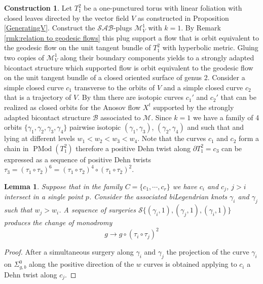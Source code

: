 \documentclass{amsart}
\newtheorem{lemma}[theorem]{Lemma}
\theoremstyle{definition}
\newtheorem{construction}[theorem]{Construction}
\theoremstyle{remark}
\DeclareMathOperator{\PMod}{PMod}
\begin{document}
\begin{construction}
\label{con}
Let $T_1^2$ be a one-punctured torus with linear foliation with closed leaves directed by the vector field $V$ as constructed in Proposition \ref{GeneratingV}. Construct the $\mathcal{SAB}$-plugs $\mathcal{M}_V^1$ with $k=1$. By Remark \ref{rmk:relation to geodesic flows} this plug support a flow that is orbit equivalent to the geodesic flow on the unit tangent bundle of $T_1^2$ with hyperbolic metric. Gluing two copies of $\mathcal{M}_V^1$ along their boundary components yields to a strongly adapted bicontact structure which supported flow is orbit equivalent to the geodesic flow on the unit tangent bundle of a closed oriented surface of genus 2. Consider a simple closed curve $c_1$ transverse to the orbits of $V$ and a simple closed curve $c_2$ that is a trajectory of $V$. By thm there are isotopic curves $c_1'$ and $c_2'$ that can be realized as closed orbits for the Anosov flow $X^t$ supported by the strongly adapted bicontact structure $\mathcal{B}$ associated to $\mathcal{M}$. Since $k=1$ we have a family of 4 orbits $\{\gamma_1,\gamma_2,\gamma_3,\gamma_4\}$ pairwise isotopic $(\gamma_1,\gamma_3)$, $(\gamma_2,\gamma_4)$ and such that  and lying at different levels $w_1<w_2<w_3<w_4$. Note that the curves $c_1$ and $c_2$ form a chain in $\PMod(T_1^2)$ therefore a positive Dehn twist along $\partial T_1^2=c_3$ can be expressed as a sequence of positive Dehn twists  
$\tau_3=(\tau_1\circ \tau_2)^6=(\tau_1\circ \tau_2)^4\circ (\tau_1\circ \tau_2)^2 $.

\begin{lemma}\label{int}
Suppose that in the family $C=\{c_1,\cdots, c_r\}$ we have $c_i$ and $c_j$,  $j>i$ intersect in a single point $p$. Consider the associated biLegendrian knots $\gamma_i$ and $\gamma_j$ such that $w_j>w_i$. A sequence of surgeries $\mathcal{S}\{(\gamma_i,1),(\gamma_j,1),(\gamma_i,1)\}$ produces the change of monodromy 
$$g\rightarrow g\circ(\tau_i\circ \tau_j)^2$$
   \end{lemma}

\begin{proof}
After a simultaneous surgery along $\gamma_i$ and $\gamma_j$ the projection of the curve $\gamma_i$ on $\Sigma^0_{g,b}$ along the positive direction of the $w$ curves is obtained applying to $c_i$ a Dehn twist along $c_j$.
\end{proof}




\end{construction}
\end{document}
